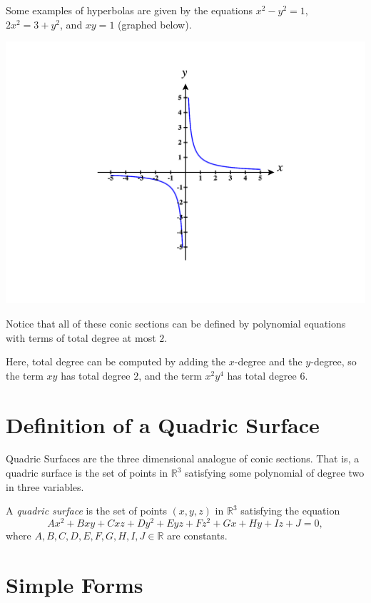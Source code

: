 \documentclass{ximera}
\begin{document}
Some examples of hyperbolas are given by the equations $x^2-y^2=1$, $2x^2=3+y^2$, and $xy=1$ (graphed below).

\begin{image}
\includegraphics[width = \textwidth]{CalcPlot3D-hyperbola}
\end{image}

Notice that all of these conic sections can be defined by polynomial equations with terms of total degree at most $2$.

Here, total degree can be computed by adding the $x$-degree and the $y$-degree, so the term $xy$ has total degree $2$, and the term $x^2y^4$ has total degree $6$.


\section*{Definition of a Quadric Surface}

Quadric Surfaces are the three dimensional analogue of conic sections. That is, a quadric surface is the set of points in $\mathbb{R}^3$ satisfying some polynomial of degree two in three variables.

\begin{definition}
A \emph{quadric surface} is the set of points $(x,y,z)$ in $\mathbb{R}^3$ satisfying the equation
\[
Ax^2 + Bxy + Cxz + Dy^2 + Eyz + Fz^2 +Gx + Hy + Iz + J = 0,
\]
where $A,B,C,D,E,F,G,H,I,J\in\mathbb{R}$ are constants.
\end{definition}

\section*{Simple Forms}
\end{document}
